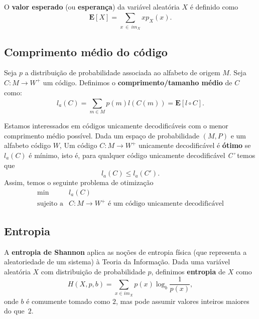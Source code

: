 O \textbf{valor esperado} (ou \textbf{esperança}) da variável aleatória $X$ é definido como
\begin{equation} \label{eq:exp_val}
\textbf{E}[X] = \sum_{x ~\in ~im_X}^{} xp_X(x).
\end{equation}
\subsection{Comprimento médio do código}
Seja $p$ a distribuição de probabilidade associada ao alfabeto de
origem $M$. Seja $C: M \to W^+$ um código. Definimos o
\textbf{comprimento/tamanho médio} de $C$ como:
\begin{equation} \label{eq:code_len}
l_a (C) = \sum_{m \in M}^{} p(m) l(C(m)) = \mathbf{E}[l\circ C].
\end{equation}

Estamos interessados em códigos unicamente decodificáveis com o menor
comprimento médio possível. Dada um espaço de probabilidade $(M, P)$ e
um alfabeto código $W$, Um código $C: M \to W^+$ unicamente
decodificável é \textbf{ótimo} se $l_a(C)$ é mínimo, isto é, para
qualquer código unicamente decodificável \emph{C'} temos que
\begin{equation} \label{eq:code_len_optimal}
l_a(C) \leq l_a(C').
\end{equation}
Assim, temos o seguinte problema de otimização
\begin{equation} \label{eq:prog_code_len}
  \begin{array}{rl}
    \min & l_a(C)\\
    \text{sujeito a} &C: M \to W^+ \text{ é um código unicamente decodificável}
  \end{array}
\end{equation}


\subsection{Entropia}
A \textbf{entropia de Shannon} aplica as noções de entropia física
(que representa a aleatoriedade de um sistema) à Teoria da
Informação. Dada uma variável aleatória $X$ com distribuição de
probabilidade $p$, definimos \textbf{entropia} de $X$ como
\begin{equation} \label{eq:entropy}
H(X, p, b) = \sum_{x \in im_X}^{} p(x) \log_b \frac{1}{p(x)},
\end{equation}
onde $b$ é comumente tomado como $2$, mas pode assumir valores inteiros maiores do que~$2$.

